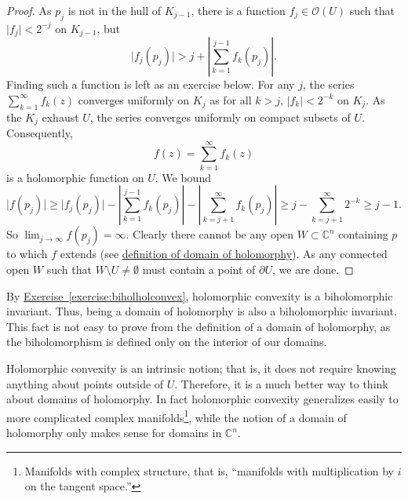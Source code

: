 \documentclass[12pt,openany]{book}
\newcommand{\sabs}[1]{\lvert {#1} \rvert}
\newcommand{\abs}[1]{\left\lvert {#1} \right\rvert}
\newcommand{\C}{{\mathbb{C}}}
\newcommand{\sO}{{\mathscr{O}}}
\theoremstyle{plain}
\theoremstyle{remark}
\theoremstyle{definition}
\theoremstyle{exercise}
\theoremstyle{example}
\newcommand{\exerciseref}[1]{\hyperref[#1]{Exercise~\ref*{#1}}}
\begin{document}
\begin{proof}
As $p_j$ is not in the hull of $K_{j-1}$, there is a function $f_j \in
\sO(U)$ such that $\sabs{f_j} < 2^{-j}$ on $K_{j-1}$, but
\begin{equation*}
\sabs{f_j(p_j)} > j + \abs{\sum_{k=1}^{j-1} f_k(p_j)} .
\end{equation*}
Finding such a function is left as an exercise below.
For any $j$, the series $\sum_{k=1}^\infty f_k(z)$ converges uniformly on $K_j$
as for all $k > j$, $\sabs{f_k} < 2^{-k}$ on $K_j$.
As the $K_j$ exhaust $U$, the series converges uniformly on compact
subsets of $U$.  Consequently,
\begin{equation*}
f(z) = \sum_{k=1}^\infty f_k(z)
\end{equation*}
is a holomorphic function on $U$.  We bound
\begin{equation*}
\sabs{f(p_j)} \geq
\sabs{f_j(p_j)}
-
\abs{\sum_{k=1}^{j-1} f_k(p_j)}
-
\abs{\sum_{k=j+1}^\infty f_k(p_j)}
\geq
j
-
\sum_{k=j+1}^\infty 2^{-k}
\geq j-1 .
\end{equation*}
So $\lim_{j\to\infty} f(p_j) = \infty$.
Clearly there cannot be any open $W \subset \C^n$
containing $p$ to which $f$ extends (see
\hyperref[defn:domainofhol]{definition of domain of holomorphy}).  As any
connected open $W$ such that $W \setminus U \not= \emptyset$ must contain a
point of $\partial U$, we are done.
\end{proof}

By \exerciseref{exercise:biholholconvex},
holomorphic convexity is a biholomorphic invariant.
Thus,
being a domain of holomorphy is also a biholomorphic invariant.  This
fact is not easy to prove from the definition of a domain of
holomorphy, as the
biholomorphism is defined only on the interior of our domains.

Holomorphic convexity is an intrinsic notion; that is, it does not require
knowing anything about points outside of $U$.  Therefore, it is a much
better way to think about domains of holomorphy.  In fact holomorphic
convexity generalizes easily to more complicated complex
manifolds\footnote{Manifolds with complex structure, that is, ``manifolds
with multiplication by $i$ on the tangent space.''}, while
the notion of a domain of holomorphy only makes sense for domains in $\C^n$.
\end{document}
